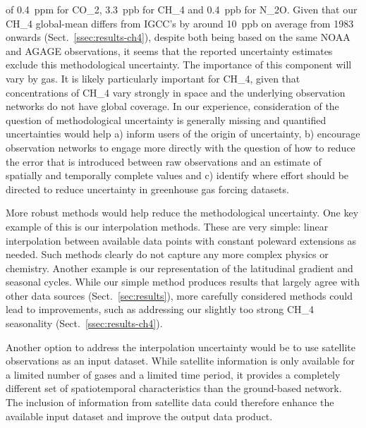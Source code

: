 of 0.4~ppm for CO_2, 3.3~ppb for CH_4 and 0.4~ppb for N_2O.
Given that our CH_4 global-mean differs from IGCC's by around 10~ppb on average from 1983 onwards (Sect.~\ref{ssec:results-ch4}),
despite both being based on the same NOAA and AGAGE observations,
it seems that the reported uncertainty estimates exclude this methodological uncertainty.
The importance of this component will vary by gas.
It is likely particularly important for CH_4,
given that concentrations of CH_4 vary strongly in space and the underlying observation networks do not have global coverage.
In our experience, consideration of the question of methodological uncertainty is generally missing
and quantified uncertainties would help a) inform users of the origin of uncertainty,
b) encourage observation networks to engage more directly with the question of how to reduce the error
that is introduced between raw observations and an estimate of spatially and temporally complete values
and c) identify where effort should be directed to reduce uncertainty in greenhouse gas forcing datasets.

More robust methods would help reduce the methodological uncertainty.
One key example of this is our interpolation methods.
These are very simple: linear interpolation between available data points
with constant poleward extensions as needed.
Such methods clearly do not capture any more complex physics or chemistry.
Another example is our representation of the latitudinal gradient and seasonal cycles.
While our simple method produces results that largely agree with other data sources (Sect.~\ref{sec:results}),
more carefully considered methods could lead to improvements,
such as addressing our slightly too strong CH_4 seasonality (Sect.~\ref{ssec:results-ch4}).

Another option to address the interpolation uncertainty would be to use satellite observations as an input dataset.
While satellite information is only available for a limited number of gases and a limited time period,
it provides a completely different set of spatiotemporal characteristics than the ground-based network.
The inclusion of information from satellite data could therefore enhance the available input dataset
and improve the output data product.

